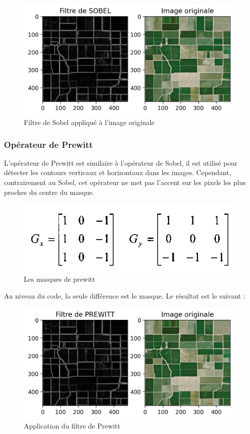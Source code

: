 \documentclass[12pt, openany]{report}
\begin{document}
\begin{figure}[H]
\centering
\includegraphics[scale=1.2]{sobel_result.png}
\caption{Filtre de Sobel appliqué à l'image originale}
\end{figure}


\subsubsection{Opérateur de Prewitt}
L'opérateur de Prewitt est similaire à l'opérateur de Sobel, il est utilisé pour détecter les contours verticaux et horizontaux dans les images. Cependant, contrairement au Sobel, cet opérateur ne met pas l'accent sur les pixels les plus proches du centre du masque.

\begin{figure}[H]
\centering
\includegraphics[scale=0.9]{prewit_masque.png}
\caption{Les masques de prewitt}
\end{figure}

Au niveau du code, la seule différence est le masque.
Le résultat est le suivant : 
\begin{figure}[H]
\centering
\includegraphics[scale=1.2]{prewitt_result.png}
\caption{Application du filtre de Prewitt}
\end{figure}
\end{document}
